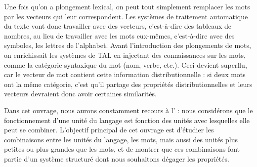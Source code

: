 {Une fois qu’on a plongement lexical, on peut tout simplement remplacer les mots par les vecteurs qui leur correspondent. Les systèmes de traitement automatique du texte vont donc travailler avec des vecteurs, c’est-à-dire des tableaux de nombres, au lieu de travailler avec les mots eux-mêmes, c’est-à-dire avec des symboles, les lettres de l’alphabet. Avant l’introduction des plongements de mots, on enrichissait les systèmes de TAL en injectant des connaissances sur les mots, comme la catégorie syntaxique du mot (nom, verbe, etc.). Ceci devient superflu, car le vecteur de mot contient cette information distributionnelle : si deux mots ont la même catégorie, c’est qu’il partage des propriétés distributionnelles et leurs vecteurs devraient donc avoir certaines similarités.

Dans cet ouvrage, nous aurons constamment recours à l’ : nous considérons que le fonctionnement d’une unité du langage est fonction des unités avec lesquelles elle peut se combiner. L’objectif principal de cet ouvrage est d’étudier les combinaisons entre les unités du langage, les mots, mais aussi des unités plus petites ou plus grandes que les mots, et de montrer que ces combinaisons font partie d’un système structuré dont nous souhaitons dégager les propriétés.}


